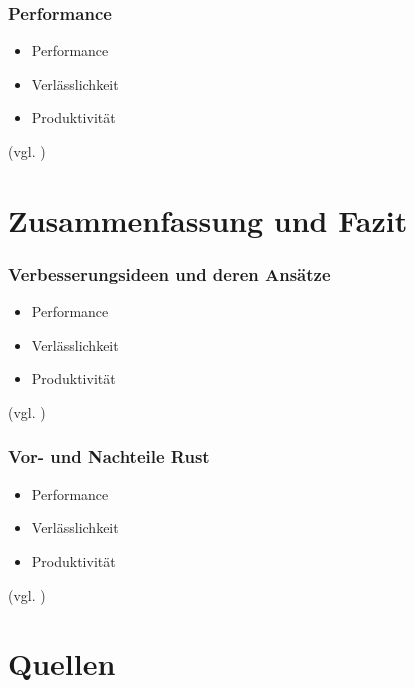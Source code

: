 \documentclass{beamer}
\begin{document}
\begin{frame}[fragile]
  \frametitle{Performance}
  \begin{itemize}
    \item Performance
    \pause
    \item Verlässlichkeit
    \pause
    \item Produktivität
  \end{itemize}
  {\small (vgl. \cite{WhyRust})}
\end{frame}

\section{Zusammenfassung und Fazit}
\begin{frame}[fragile]
  \frametitle{Verbesserungsideen und deren Ansätze}
  \begin{itemize}
    \item Performance
    \pause
    \item Verlässlichkeit
    \pause
    \item Produktivität
  \end{itemize}
  {\small (vgl. \cite{WhyRust})}
\end{frame}

\begin{frame}[fragile]
  \frametitle{Vor- und Nachteile Rust}
  \begin{itemize}
    \item Performance
    \pause
    \item Verlässlichkeit
    \pause
    \item Produktivität
  \end{itemize}
  {\small (vgl. \cite{WhyRust})}
\end{frame}

\section{Quellen}
\begin{frame}
  
  \raggedright
  
\end{frame}
\end{document}
